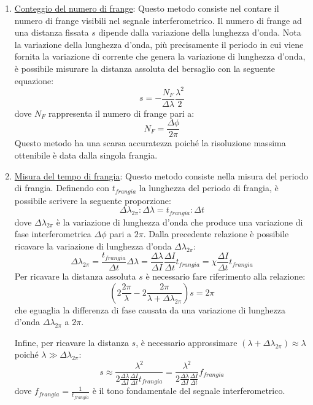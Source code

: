 \begin{enumerate}
	\item \underline{Conteggio del numero di frange}: Questo metodo consiste nel contare il numero di frange visibili nel segnale interferometrico. Il numero di frange ad una distanza fissata $s$ dipende dalla variazione della lunghezza d'onda. Nota la variazione della lunghezza d'onda, più precisamente il periodo in cui viene fornita la variazione di corrente che genera la variazione di lunghezza d'onda, è possibile misurare la distanza assoluta del bersaglio con la seguente equazione:
	\begin{equation}
		s=-\frac{N_F}{\Delta \lambda}\frac{\lambda^2}{2}
	\end{equation}
	dove $N_F$ rappresenta il numero di frange pari a:
	\begin{equation}
		N_F=\frac{\Delta \phi}{2 \pi}
	\end{equation}
	Questo metodo ha una scarsa accuratezza poiché la risoluzione massima ottenibile è data dalla singola frangia. 
	\item \underline{Misura del tempo di frangia}: Questo metodo consiste nella misura del periodo di frangia. Definendo con $t_{frangia}$ la lunghezza del periodo di frangia, è possibile scrivere la seguente proporzione:
	\begin{equation}
		\Delta \lambda_{2\pi} : \Delta \lambda = t_{frangia} : \Delta t
	\end{equation}
dove $\Delta \lambda_{2\pi}$ è la variazione di lunghezza d'onda che produce una variazione di fase interferometrica $\Delta \phi$ pari a $2\pi$.
Dalla precedente relazione è possibile ricavare la variazione di lunghezza d'onda $\Delta \lambda_{2\pi}$:
	\begin{equation}
		\Delta \lambda_{2\pi} = \frac{t_{frangia}}{\Delta t} \Delta \lambda = \frac{\Delta \lambda}{\Delta I}\frac{\Delta I}{\Delta t} t_{frangia} = \chi \frac{\Delta I}{\Delta t} t_{frangia}
	\end{equation}
	Per ricavare la distanza assoluta $s$ è necessario fare riferimento alla relazione:
	\begin{equation}
		\left ( 2\frac{2\pi}{\lambda}-2\frac{2\pi}{\lambda + \Delta \lambda_{2\pi}} \right ) s = 2\pi
	\end{equation}
	che eguaglia la differenza di fase causata da una variazione di lunghezza d'onda $\Delta \lambda_{2\pi}$ a $2\pi$.
	
	Infine, per ricavare la distanza $s$, è necessario approssimare $(\lambda + \Delta \lambda_{2\pi}) \approx \lambda$ poiché $\lambda \gg \Delta \lambda_{2\pi}$:
	\begin{equation}
		s \approx \frac{\lambda^2}{2\frac{\Delta \lambda}{\Delta I}\frac{\Delta I}{\Delta t} t_{frangia}} =  \frac{\lambda^2}{2\frac{\Delta \lambda}{\Delta I}\frac{\Delta I}{\Delta t}}f_{frangia}
	\end{equation}
	dove $f_{frangia}=\frac{1}{t_{frangia}}$ è il tono fondamentale del segnale interferometrico.
	

\end{enumerate}
